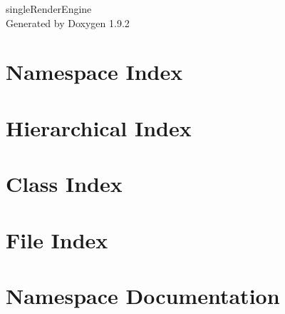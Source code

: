 \documentclass[twoside]{book}
\newcommand{\+}{\discretionary{\mbox{\scriptsize$\hookleftarrow$}}{}{}}
\newcommand{\clearemptydoublepage}{%
    \newpage{\pagestyle{empty}\cleardoublepage}%
  }
\begin{document}
  \raggedbottom
    \hypersetup{pageanchor=false,
                bookmarksnumbered=true,
                pdfencoding=unicode
               }
  \begin{titlepage}
  \vspace*{7cm}
  \begin{center}%
  {\Large single\+Render\+Engine}\\
  \vspace*{1cm}
  {\large Generated by Doxygen 1.9.2}\\
  \end{center}
  \end{titlepage}
  \clearemptydoublepage
  \tableofcontents
  \clearemptydoublepage
  \hypersetup{pageanchor=true}
\chapter{Namespace Index}

\chapter{Hierarchical Index}

\chapter{Class Index}

\chapter{File Index}

\chapter{Namespace Documentation}

\end{document}
